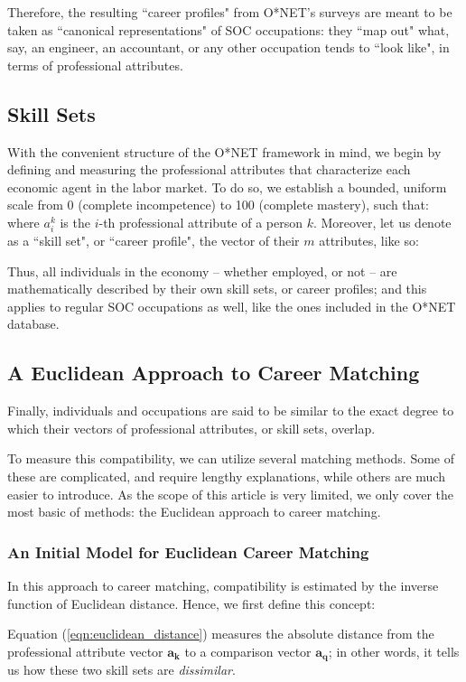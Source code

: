 \documentclass{article}
\begin{document}
Therefore, the resulting ``career profiles" from O*NET's surveys are meant to
be taken as ``canonical representations" of SOC occupations: they ``map out"
what, say, an engineer, an accountant, or any other occupation tends to ``look
like", in terms of professional attributes.

\subsection{Skill Sets}
With the convenient structure of the O*NET framework in mind, we begin by
defining and measuring the professional attributes that characterize each
economic agent in the labor market. To do so, we establish a bounded, uniform
scale from 0 (complete incompetence) to 100 (complete mastery), such that:
\EqnAttribute where $a_{i}^{k}$ is the $i$-th professional attribute of a
person $k$. Moreover, let us denote as a ``skill set", or ``career profile",
the vector of their $m$ attributes, like so: \EqnSkillSet

Thus, all individuals in the economy -- whether employed, or not -- are
mathematically described by their own skill sets, or career profiles; and this
applies to regular SOC occupations as well, like the ones included in the O*NET
database.

\subsection{A Euclidean Approach to Career Matching}
Finally, individuals and occupations are said to be similar to the exact degree
to which their vectors of professional attributes, or skill sets, overlap.

To measure this compatibility, we can utilize several matching methods. Some of
these are complicated, and require lengthy explanations, while others are much
easier to introduce. As the scope of this article is very limited, we only
cover the most basic of methods: the Euclidean approach to career matching.

\subsubsection{An Initial Model for Euclidean Career Matching}
In this approach to career matching, compatibility is estimated by the inverse
function of Euclidean distance. Hence, we first define this concept:
\EqnEuclideanDistance

Equation (\ref{eqn:euclidean_distance}) measures the absolute distance from the
professional attribute vector $\boldsymbol{a_{\boldsymbol{k}}}$ to a comparison
vector $\boldsymbol{a_{q}}$; in other words, it tells us how these two skill
sets are \textit{dissimilar}.
\end{document}
